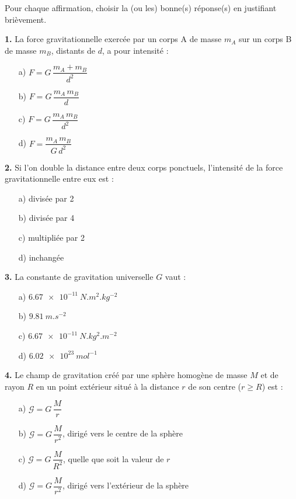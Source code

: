 \documentclass[11pt]{article}
\begin{document}
\begin{exercice}
Pour chaque affirmation, choisir la (ou les) bonne(s) réponse(s) en justifiant brièvement.

\textbf{1.} La force gravitationnelle exercée par un corps A de masse $m_A$ sur un corps B de masse $m_B$, distants de $d$, a pour intensité :
\begin{itemize}
\item[a)] $F = G\,\dfrac{m_A + m_B}{d^2}$
\item[b)] $F = G\,\dfrac{m_A\, m_B}{d}$
\item[c)] $F = G\,\dfrac{m_A\, m_B}{d^2}$
\item[d)] $F = \dfrac{m_A\, m_B}{G\, d^2}$
\end{itemize}

\textbf{2.} Si l'on double la distance entre deux corps ponctuels, l'intensité de la force gravitationnelle entre eux est :
\begin{itemize}
\item[a)] divisée par 2
\item[b)] divisée par 4
\item[c)] multipliée par 2
\item[d)] inchangée
\end{itemize}

\textbf{3.} La constante de gravitation universelle $G$ vaut :
\begin{itemize}
\item[a)] $\SI{6,67e-11}{N.m^2.kg^{-2}}$
\item[b)] $\SI{9,81}{m.s^{-2}}$
\item[c)] $\SI{6,67e-11}{N.kg^2.m^{-2}}$
\item[d)] $\SI{6,02e23}{mol^{-1}}$
\end{itemize}

\textbf{4.} Le champ de gravitation créé par une sphère homogène de masse $M$ et de rayon $R$ en un point extérieur situé à la distance $r$ de son centre ($r \geq R$) est :
\begin{itemize}
\item[a)] $\mathcal{G} = G\,\dfrac{M}{r}$
\item[b)] $\mathcal{G} = G\,\dfrac{M}{r^2}$, dirigé vers le centre de la sphère
\item[c)] $\mathcal{G} = G\,\dfrac{M}{R^2}$, quelle que soit la valeur de $r$
\item[d)] $\mathcal{G} = G\,\dfrac{M}{r^2}$, dirigé vers l'extérieur de la sphère
\end{itemize}
\end{exercice}
\end{document}
